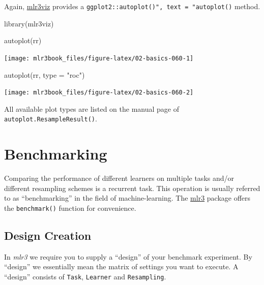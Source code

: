 \documentclass[
  11pt,
  parskip=half,
  DIV=calc,
  BCOR=10mm,
  x11names]{scrbook}
\newenvironment{Shaded}{}{}
\newcommand{\DataTypeTok}[1]{#1}
\newcommand{\KeywordTok}[1]{\textcolor[rgb]{0.00,0.00,1.00}{#1}}
\newcommand{\NormalTok}[1]{#1}
\newcommand{\StringTok}[1]{\textcolor[rgb]{0.00,0.50,0.50}{#1}}
\begin{document}
Again, \href{https://mlr3viz.mlr-org.com}{mlr3viz} provides a \texttt{ggplot2::autoplot()",\ text\ =\ "autoplot()} method.

\begin{Shaded}
\begin{Highlighting}[]
\KeywordTok{library}\NormalTok{(mlr3viz)}

\KeywordTok{autoplot}\NormalTok{(rr)}
\end{Highlighting}
\end{Shaded}

\begin{center}\texttt{[image: mlr3book\_files/figure-latex/02-basics-060-1]} \end{center}

\begin{Shaded}
\begin{Highlighting}[]
\KeywordTok{autoplot}\NormalTok{(rr, }\DataTypeTok{type =} \StringTok{"roc"}\NormalTok{)}
\end{Highlighting}
\end{Shaded}

\begin{center}\texttt{[image: mlr3book\_files/figure-latex/02-basics-060-2]} \end{center}

All available plot types are listed on the manual page of \texttt{autoplot.ResampleResult()}.

\hypertarget{benchmarking}{%
\section{Benchmarking}\label{benchmarking}}

Comparing the performance of different learners on multiple tasks and/or different resampling schemes is a recurrent task.
This operation is usually referred to as ``benchmarking'' in the field of machine-learning.
The \href{https://mlr3.mlr-org.com}{mlr3} package offers the \texttt{benchmark()} function for convenience.

\hypertarget{bm-design}{%
\subsection{Design Creation}\label{bm-design}}

In \emph{mlr3} we require you to supply a ``design'' of your benchmark experiment.
By ``design'' we essentially mean the matrix of settings you want to execute.
A ``design'' consists of \texttt{Task}, \texttt{Learner} and \texttt{Resampling}.
\end{document}
